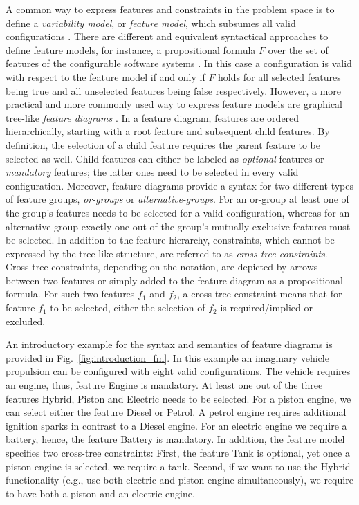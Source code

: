 A common way to express features and constraints in the problem space is to
define a \emph{variability model}, or \emph{feature model}, which subsumes all
valid configurations
\citep{kang_feature-oriented_1990,apel_feature-oriented_2013}. There are different and equivalent syntactical approaches to define feature models, for instance, a propositional formula $F$ over the set of
features of the configurable software systems \citep{batory_feature_2005}. In
this case a configuration is valid with respect to the feature model if and only if $F$ holds for all
selected features being true and all unselected features being false respectively. 
However, a more practical and more commonly used way to express feature models
are graphical tree-like \emph{feature diagrams}
\citep{apel_feature-oriented_2013}. In a feature diagram, features are ordered
hierarchically, starting with a root feature and subsequent child features. By
definition, the selection of a child feature requires the parent feature to be
selected as well. Child features can either be labeled as \emph{optional}
features  or \emph{mandatory} features; the latter ones need to be selected in
every valid configuration.
Moreover, feature diagrams
provide a syntax for two different types of feature groups, \emph{or-groups} or
\emph{alternative-groups}. For an or-group at least one of the group's features
needs to be selected for a valid configuration, whereas for an alternative group
exactly one out of the group's mutually exclusive features must be selected. In
addition to the feature hierarchy, constraints, which cannot be expressed by
the tree-like structure, are referred to as \emph{cross-tree constraints}.
Cross-tree constraints, depending on the notation, are depicted by arrows
between two features or simply added to the feature diagram as a propositional
formula. For such two features $f_1$ and $f_2$, a cross-tree constraint means
that for feature $f_1$ to be selected, either the selection of $f_2$ is
required/implied or excluded.

An introductory example for the syntax and semantics of feature diagrams is
provided in Fig.~\ref{fig:introduction_fm}. In this example an imaginary
vehicle propulsion can be configured with eight valid configurations. The vehicle requires an engine,
thus, feature \textsf{Engine} is mandatory. At least one out of the three
features \textsf{Hybrid}, \textsf{Piston} and \textsf{Electric} needs to be
selected. For a piston engine, we can select either the feature \textsf{Diesel}
or \textsf{Petrol}. A petrol engine requires additional ignition sparks in
contrast to a Diesel engine. For an electric engine we require a
battery, hence, the feature \textsf{Battery} is mandatory.
In addition, the feature model specifies two cross-tree constraints: First, the
feature \textsf{Tank} is optional, yet once a piston engine is selected, we
require  a tank. Second, if we want to use the \textsf{Hybrid} functionality
(e.g., use both electric and piston engine simultaneously), we require to have both a piston
and an electric engine.

